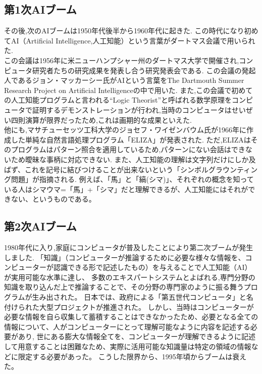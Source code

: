 \subsection{第1次AIブーム}
その後,次のAIブームは1950年代後半から1960年代に起きた.
この時代になり初めてAI（Artificial Intelligence,人工知能）という言葉がダートマス会議で用いられた.\\
この会議は1956年に米ニューハンプシャー州のダートマス大学で開催され,コンピュータ研究者たちの研究成果を発表し合う研究発表会である.\cite{webpage4}
この会議の発起人であるジョン・マッカーシー氏がAIという言葉をThe Dartmouth Summer Research Project on Artificial Intelligence\cite{ronbun2}の中で用いた.
また,この会議で初めての人工知能プログラムと言われる“Logic Theorist”と呼ばれる数学原理をコンピュータで証明するデモンストレーションが行われ,当時のコンピュータはせいぜい四則演算が限界だったため,これは画期的な成果といえた.\\
他にも,マサチューセッツ工科大学のジョセフ・ワイゼンバウム氏が1966年に作成した単純な自然言語処理プログラム「ELIZA」が発表された.
ただ,ELIZAはそのプログラムはパターン照合を適用しているため,パターンにない会話はできないため曖昧な事柄に対応できない.
また、人工知能の理解は文字列だけにしか及ばず、これを記号に結びつけることが出来ないという「シンボルグラウンティング問題」が指摘される.
例えば、「馬」と「縞(シマ)」、それぞれの概念を知っている人はシマウマ=「馬」+「シマ」だと理解できるが、人工知能にはそれができない、というものである。
\subsection{第2次AIブーム}
1980年代に入り,家庭にコンピュータが普及したことにより第二次ブームが発生しました.
「知識」（コンピューターが推論するために必要な様々な情報を、コンピューターが認識できる形で記述したもの）を与えることで人工知能（AI）が実用可能な水準に達し、
多数のエキスパートシステムとよばれる,専門分野の知識を取り込んだ上で推論することで、その分野の専門家のように振る舞うプログラムが生み出された。
日本では、政府による「第五世代コンピュータ」と名付けられた大型プロジェクトが推進された。
しかし、当時はコンピューターが必要な情報を自ら収集して蓄積することはできなかったため、必要となる全ての情報について、人がコンピューターにとって理解可能なように内容を記述する必要があり,
世にある膨大な情報全てを、コンピューターが理解できるように記述して用意することは困難なため、実際に活用可能な知識量は特定の領域の情報などに限定する必要があった。
こうした限界から、1995年頃からブームは衰えた。

